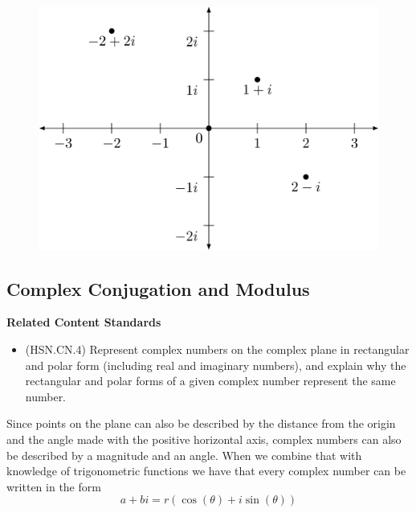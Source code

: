 \documentclass[
]{book}
\providecommand{\tightlist}{%
  \setlength{\itemsep}{0pt}\setlength{\parskip}{0pt}}
\newenvironment{standards}{}{}
\theoremstyle{definition}
\theoremstyle{definition}
\theoremstyle{definition}
\theoremstyle{definition}
\theoremstyle{remark}
\begin{document}
\begin{figure}

{\centering \includegraphics[width=0.6\linewidth]{tikz/complex-rectangular} 

}

\end{figure}

\hypertarget{complex-conjugation-and-modulus}{%
\subsection{Complex Conjugation and Modulus}\label{complex-conjugation-and-modulus}}

\begin{standards}

\begin{center}
\textbf{Related Content Standards}

\end{center}

\begin{itemize}
\tightlist
\item
  (HSN.CN.4) Represent complex numbers on the complex plane in rectangular and polar form (including real and imaginary numbers), and explain why the rectangular and polar forms of a given complex number represent the same number.
\end{itemize}

\end{standards}

Since points on the plane can also be described by the distance from the origin and the angle made with the positive horizontal axis, complex numbers can also be described by a magnitude and an angle. When we combine that with knowledge of trigonometric functions we have that every complex number can be written in the form
\[a+bi = r(\cos(\theta) + i \sin(\theta))\]
\end{document}
